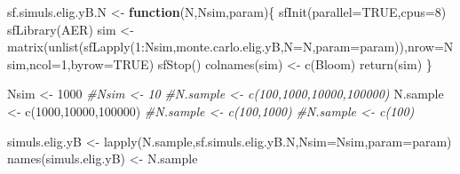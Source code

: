 \documentclass[
]{book}
\newenvironment{Shaded}{\begin{snugshade}}{\end{snugshade}}
\newcommand{\AttributeTok}[1]{\textcolor[rgb]{0.77,0.63,0.00}{#1}}
\newcommand{\CommentTok}[1]{\textcolor[rgb]{0.56,0.35,0.01}{\textit{#1}}}
\newcommand{\ConstantTok}[1]{\textcolor[rgb]{0.00,0.00,0.00}{#1}}
\newcommand{\ControlFlowTok}[1]{\textcolor[rgb]{0.13,0.29,0.53}{\textbf{#1}}}
\newcommand{\DecValTok}[1]{\textcolor[rgb]{0.00,0.00,0.81}{#1}}
\newcommand{\FunctionTok}[1]{\textcolor[rgb]{0.00,0.00,0.00}{#1}}
\newcommand{\NormalTok}[1]{#1}
\newcommand{\OtherTok}[1]{\textcolor[rgb]{0.56,0.35,0.01}{#1}}
\newcommand{\SpecialCharTok}[1]{\textcolor[rgb]{0.00,0.00,0.00}{#1}}
\newcommand{\StringTok}[1]{\textcolor[rgb]{0.31,0.60,0.02}{#1}}
\theoremstyle{definition}
\theoremstyle{definition}
\theoremstyle{definition}
\theoremstyle{definition}
\theoremstyle{remark}
\begin{document}
\begin{Shaded}
\begin{Highlighting}[]
\NormalTok{sf.simuls.elig.yB.N }\OtherTok{\textless{}{-}} \ControlFlowTok{function}\NormalTok{(N,Nsim,param)\{}
  \FunctionTok{sfInit}\NormalTok{(}\AttributeTok{parallel=}\ConstantTok{TRUE}\NormalTok{,}\AttributeTok{cpus=}\DecValTok{8}\NormalTok{)}
  \FunctionTok{sfLibrary}\NormalTok{(AER)}
\NormalTok{  sim }\OtherTok{\textless{}{-}} \FunctionTok{matrix}\NormalTok{(}\FunctionTok{unlist}\NormalTok{(}\FunctionTok{sfLapply}\NormalTok{(}\DecValTok{1}\SpecialCharTok{:}\NormalTok{Nsim,monte.carlo.elig.yB,}\AttributeTok{N=}\NormalTok{N,}\AttributeTok{param=}\NormalTok{param)),}\AttributeTok{nrow=}\NormalTok{Nsim,}\AttributeTok{ncol=}\DecValTok{1}\NormalTok{,}\AttributeTok{byrow=}\ConstantTok{TRUE}\NormalTok{)}
  \FunctionTok{sfStop}\NormalTok{()}
  \FunctionTok{colnames}\NormalTok{(sim) }\OtherTok{\textless{}{-}} \FunctionTok{c}\NormalTok{(}\StringTok{\textquotesingle{}Bloom\textquotesingle{}}\NormalTok{)}
  \FunctionTok{return}\NormalTok{(sim)}
\NormalTok{\}}

\NormalTok{Nsim }\OtherTok{\textless{}{-}} \DecValTok{1000}
\CommentTok{\#Nsim \textless{}{-} 10}
\CommentTok{\#N.sample \textless{}{-} c(100,1000,10000,100000)}
\NormalTok{N.sample }\OtherTok{\textless{}{-}} \FunctionTok{c}\NormalTok{(}\DecValTok{1000}\NormalTok{,}\DecValTok{10000}\NormalTok{,}\DecValTok{100000}\NormalTok{)}
\CommentTok{\#N.sample \textless{}{-} c(100,1000)}
\CommentTok{\#N.sample \textless{}{-} c(100)}

\NormalTok{simuls.elig.yB }\OtherTok{\textless{}{-}} \FunctionTok{lapply}\NormalTok{(N.sample,sf.simuls.elig.yB.N,}\AttributeTok{Nsim=}\NormalTok{Nsim,}\AttributeTok{param=}\NormalTok{param)}
\FunctionTok{names}\NormalTok{(simuls.elig.yB) }\OtherTok{\textless{}{-}}\NormalTok{ N.sample}
\end{Highlighting}
\end{Shaded}
\end{document}
